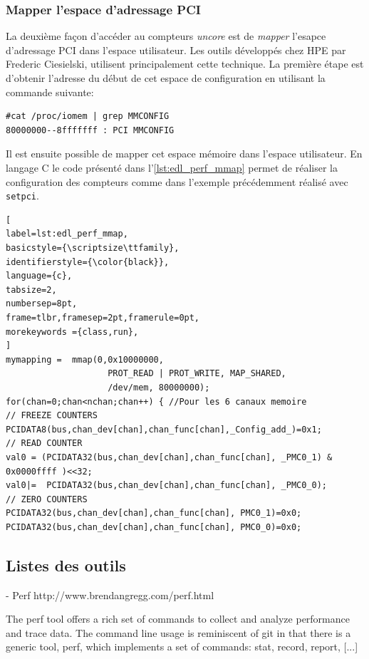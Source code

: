     \subsubsection{Mapper l'espace d'adressage PCI}
    La deuxième façon d'accéder au compteurs \textit{uncore} est de \textit{mapper} l'esapce d'adressage PCI dans l'espace utilisateur. Les outils développés chez HPE par Frederic Ciesielski,  utilisent principalement cette technique. La première étape est d'obtenir l'adresse du début de cet espace de configuration en utilisant la commande suivante:
\begin{verbatim}
#cat /proc/iomem | grep MMCONFIG  
80000000--8fffffff : PCI MMCONFIG
\end{verbatim}
    Il est ensuite possible de mapper cet espace mémoire dans l'espace utilisateur. En langage C le code présenté dans l'\autoref{lst:edl_perf_mmap} permet de réaliser la configuration des compteurs comme dans l'exemple précédemment réalisé avec \verb|setpci|.
    \begin{lstlisting}[
label=lst:edl_perf_mmap,
basicstyle={\scriptsize\ttfamily},
identifierstyle={\color{black}},
language={c},
tabsize=2,
numbersep=8pt,
frame=tlbr,framesep=2pt,framerule=0pt,
morekeywords ={class,run},
]
mymapping =  mmap(0,0x10000000, 
		            PROT_READ | PROT_WRITE, MAP_SHARED, 		 
		            /dev/mem, 80000000);
for(chan=0;chan<nchan;chan++) { //Pour les 6 canaux memoire 
// FREEZE COUNTERS 
PCIDATA8(bus,chan_dev[chan],chan_func[chan],_Config_add_)=0x1; 
// READ COUNTER 
val0 = (PCIDATA32(bus,chan_dev[chan],chan_func[chan], _PMC0_1) & 0x0000ffff )<<32; 
val0|=  PCIDATA32(bus,chan_dev[chan],chan_func[chan], _PMC0_0); 
// ZERO COUNTERS 
PCIDATA32(bus,chan_dev[chan],chan_func[chan], PMC0_1)=0x0;
PCIDATA32(bus,chan_dev[chan],chan_func[chan], PMC0_0)=0x0;
\end{lstlisting}
    
    
    \subsection{Listes des outils}
    
    - Perf
    http://www.brendangregg.com/perf.html
        
    The perf tool offers a rich set of commands to collect and analyze performance and trace data. The command line usage is reminiscent of git in that there is a generic tool, perf, which implements a set of commands: stat, record, report, [...]
       
